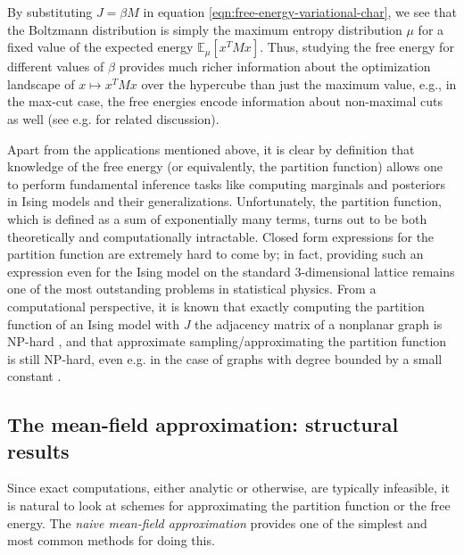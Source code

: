 \documentclass[final, 12pt]{colt2018}
\newcommand{\bE}{\mathbb{E}}
\newcommand{\E}{\bE}      %
\newcommand{\vnote}[1]{\textcolor{red}{\small {\textbf{(Vishesh: }#1\textbf{) }}}}
\newcommand{\fnote}[1]{\textcolor{blue}{\small {\textbf{(Fred: }#1\textbf{) }}}}
\theoremstyle{definition}
\theoremstyle{plain}
\begin{document}
By substituting $J = \beta M$ in equation \cref{eqn:free-energy-variational-char}, we see %
that the Boltzmann distribution is simply the maximum entropy distribution $\mu$ for a fixed value
of the expected energy $\E_{\mu}[x^T M x]$. Thus, studying the free
energy for different values of $\beta$ provides much richer information about
the optimization landscape of $x \mapsto x^T M x$ over the hypercube than just the maximum value, e.g., in the max-cut case, the free energies encode
information about non-maximal cuts as well (see e.g. \citet{borgs2012convergent} for related discussion).

Apart from the applications mentioned above, it is clear by definition that knowledge of the free energy (or equivalently, the partition function) allows one to perform fundamental inference tasks like computing marginals and posteriors in Ising models and their generalizations. Unfortunately, the partition function, which is defined as a sum of exponentially many terms, turns out to be both theoretically and computationally intractable. Closed form expressions for the partition function are extremely hard to come by; in fact, providing such an expression even for the Ising model on the standard $3$-dimensional lattice remains one of the most outstanding problems in statistical physics. From a computational perspective, it is known that exactly computing the partition function of an Ising model with $J$ the adjacency matrix of a nonplanar graph is NP-hard \citep{Istrail2000StatisticalMT}, and that approximate sampling/approximating the partition function is still NP-hard, even e.g. in the case of graphs with degree bounded by a small constant \citep{sly-sun}.

\subsection{The mean-field approximation: structural results}
Since exact computations, either analytic or otherwise, are typically infeasible, it is natural to look at schemes for approximating the partition function or the free energy. The \emph{naive mean-field approximation} provides one of the simplest and most common methods for doing this.  
\end{document}
